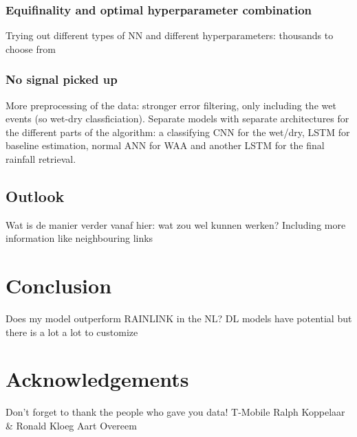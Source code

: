 \documentclass[twocolumn, 10pt, a4paper]{memoir}
\begin{document}
	
	\subsection{Equifinality and optimal hyperparameter combination} \label{sec: Equifinality}
	Trying out different types of NN and different hyperparameters: thousands to choose from
	
	\subsection{No signal picked up} \label{sec: no results}
	More preprocessing of the data: stronger error filtering, only including the wet events (so wet-dry classficiation). Separate models with separate architectures for the different parts of the algorithm: a classifying CNN for the wet/dry, LSTM for baseline estimation, normal ANN for WAA and another LSTM for the final rainfall retrieval.
	
	\section{Outlook}
	Wat is de manier verder vanaf hier: wat zou wel kunnen werken? 
	Including more information like neighbouring links
	
	\chapter{Conclusion} \label{ch: conclusion}
	Does my model outperform RAINLINK in the NL?
	DL models have potential but there is a lot a lot to customize
	
	
	
	\chapter*{Acknowledgements}\vspace{-6mm}       %
	
	Don't forget to thank the people who gave you data!
	T-Mobile Ralph Koppelaar \& Ronald Kloeg 
	Aart Overeem
	
	\renewcommand{\bibname}{Bibliography}
	
	
	
\end{document}
